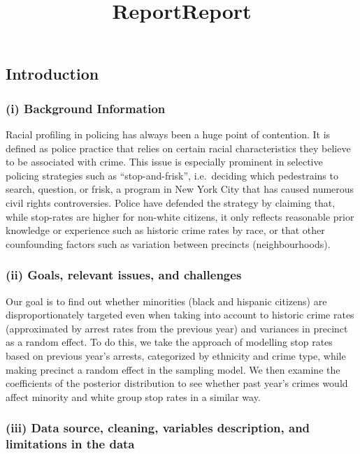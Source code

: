 \documentclass[]{article}
\title{Report}
\date{}
\title{Report}
\author{}
\date{\vspace{-2.5em}}
\begin{document}
\maketitle

\hypertarget{introduction}{%
\subsection{Introduction}\label{introduction}}

\hypertarget{i-background-information}{%
\subsubsection{(i) Background
Information}\label{i-background-information}}

Racial profiling in policing has always been a huge point of contention.
It is defined as police practice that relies on certain racial
characteristics they believe to be associated with crime. This issue is
especially prominent in selective policing strategies such as
``stop-and-frisk'', i.e.~deciding which pedestrains to search, question,
or frisk, a program in New York City that has caused numerous civil
rights controversies. Police have defended the strategy by claiming
that, while stop-rates are higher for non-white citizens, it only
reflects reasonable prior knowledge or experience such as historic crime
rates by race, or that other counfounding factors such as variation
between precincts (neighbourhoods).

\hypertarget{ii-goals-relevant-issues-and-challenges}{%
\subsubsection{(ii) Goals, relevant issues, and
challenges}\label{ii-goals-relevant-issues-and-challenges}}

Our goal is to find out whether minorities (black and hispanic citizens)
are disproportionately targeted even when taking into account to
historic crime rates (approximated by arrest rates from the previous
year) and variances in precinct as a random effect. To do this, we take
the approach of modelling stop rates based on previous year's arrests,
categorized by ethnicity and crime type, while making precinct a random
effect in the sampling model. We then examine the coefficients of the
posterior distribution to see whether past year's crimes would affect
minority and white group stop rates in a similar way.

\hypertarget{iii-data-source-cleaning-variables-description-and-limitations-in-the-data}{%
\subsubsection{(iii) Data source, cleaning, variables description, and
limitations in the
data}\label{iii-data-source-cleaning-variables-description-and-limitations-in-the-data}}
\end{document}
